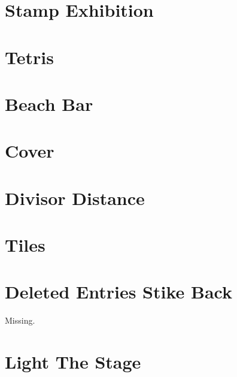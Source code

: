 \documentclass[a4paper, 10pt]{article}
\let\stdsection\section
\renewcommand\section{\newpage\stdsection}
\newcommand{\includecode}[1]{
    }
\newcommand{\algoAuthor}{2} %
\begin{document}
    \section{Stamp Exhibition}
        \includecode{../problems/w10/Stamp_Exhibition/StampExhibition\algoAuthor.cpp}
        
    \section{Tetris}
        \includecode{../problems/w10/Tetris/Tetris\algoAuthor.cpp}
 
    
    \section{Beach Bar}
        \includecode{../problems/w11/Beach_Bar/BeachBar\algoAuthor.cpp}
        
    \section{Cover}
        \includecode{../problems/w11/Cover/Cover\algoAuthor.cpp}
        
    \section{Divisor Distance}
        \includecode{../problems/w11/Divisor_Distance/DivisorDistance\algoAuthor.cpp}
        
    \section{Tiles}
        \includecode{../problems/w11/Tiles/Tiles\algoAuthor.cpp}
        
    
    \section{Deleted Entries Stike Back}
        Missing.
        
    \section{Light The Stage}
        \includecode{../problems/w12/Light_The_Stage/LightTheStage\algoAuthor.cpp}
        
\end{document}
